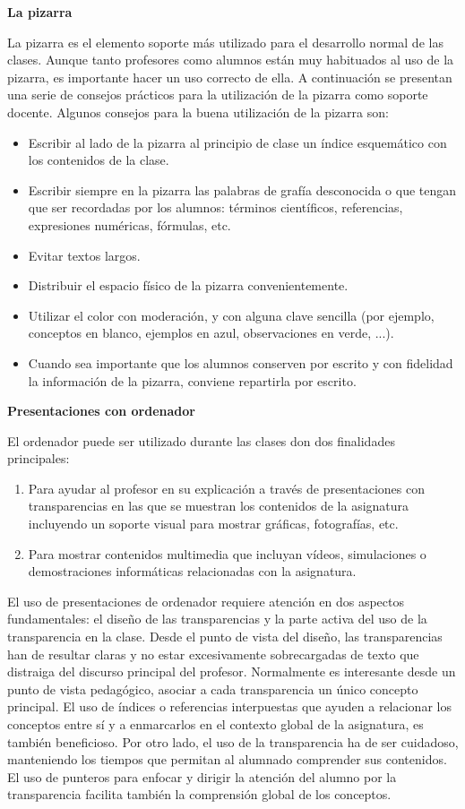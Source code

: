 \textbf{La pizarra}

La pizarra es el elemento soporte más utilizado para el desarrollo normal de las clases. Aunque tanto profesores como alumnos están muy habituados al uso de la pizarra, es importante hacer un uso correcto de ella. A continuación se presentan una serie de consejos prácticos para la utilización de la pizarra como soporte docente. Algunos consejos para la buena utilización de la pizarra son:
\begin{itemize}
\item	Escribir al lado de la pizarra al principio de clase un índice esquemático con los contenidos de la clase.
\item	Escribir siempre en la pizarra las palabras de grafía desconocida o que tengan que ser recordadas por los alumnos: términos científicos, referencias, expresiones numéricas, fórmulas, etc.
\item	Evitar textos largos.
\item	Distribuir el espacio físico de la pizarra convenientemente.
\item	Utilizar el color con moderación, y con alguna clave sencilla (por ejemplo, conceptos en blanco, ejemplos en azul, observaciones en verde, ...).
\item	Cuando sea importante que los alumnos conserven por escrito y con fidelidad la información de la pizarra, conviene repartirla por escrito.
\end{itemize}


\textbf{Presentaciones con ordenador}

El ordenador puede ser utilizado durante las clases don dos finalidades principales: 

\begin{enumerate}
\item Para ayudar al profesor en su explicación a través de presentaciones con transparencias en las que se muestran los contenidos de la asignatura incluyendo un soporte visual para mostrar gráficas, fotografías, etc.
\item Para mostrar contenidos multimedia que incluyan vídeos, simulaciones o demostraciones informáticas relacionadas con la asignatura. 
\end{enumerate}

El uso de presentaciones de ordenador requiere atención en dos aspectos fundamentales: el diseño de las transparencias y la parte activa del uso de la transparencia en la clase. Desde el punto de vista del diseño, las transparencias han de resultar claras y no estar excesivamente sobrecargadas de texto que distraiga del discurso principal del profesor. Normalmente es interesante desde un punto de vista pedagógico, asociar a cada transparencia un único concepto principal. El uso de índices o referencias interpuestas que ayuden a relacionar los conceptos entre sí y a enmarcarlos en el contexto global de la asignatura, es también beneficioso. Por otro lado, el uso de la transparencia ha de ser cuidadoso, manteniendo los tiempos que permitan al alumnado comprender sus contenidos. El uso de punteros para enfocar y dirigir la atención del alumno por la transparencia facilita también la comprensión global de los conceptos.  

